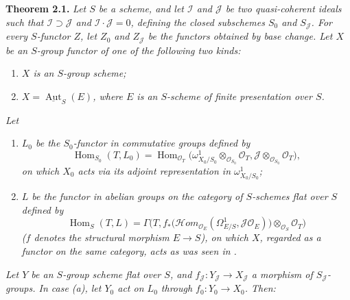 \medskip
\noindent{}\textbf{Theorem 2.1.}
\textit{Let \(S\) be a scheme, and let \(\mathscr I\) and \(\mathscr J\) be
two quasi-coherent ideals such that \(\mathscr I\supset\mathscr J\) and
\(\mathscr I\cdot\mathscr J=0\), defining the closed subschemes \(S_0\) and
\(S_{\mathscr J}\). For every \(S\)-functor \(Z\), let \(Z_0\) and
\(Z_{\mathscr J}\) be the functors obtained by base change. Let \(X\) be an
\(S\)-group functor of one of the following two kinds:}
\begin{enumerate}
\item[\(a\))] \textit{\(X\) is an \(S\)-group scheme;}
\item[\(b\))] \textit{\(X=\underline{\operatorname{Aut}}_S(E)\), where \(E\) is
  an \(S\)-scheme of finite presentation over \(S\).}
\end{enumerate}
\textit{Let}
\begin{enumerate}
\item[\(a\))] \textit{\(L_0\) be the \(S_0\)-functor in commutative groups
  defined by}
  \[
   \operatorname{Hom}_{S_0}(T,L_0)
   =\operatorname{Hom}_{\mathscr O_T}
   \bigl(\omega^1_{X_0/S_0}\otimes_{\mathscr O_{S_0}}\mathscr O_T,
   \mathscr J\otimes_{\mathscr O_{S_0}}\mathscr O_T\bigr),
  \]
  \textit{on which \(X_0\) acts via its adjoint representation in
  \(\omega^1_{X_0/S_0}\);}
\item[\(b\))] \textit{\(L\) be the functor in abelian groups on the category of
  \(S\)-schemes flat over \(S\) defined by}
  \[
   \operatorname{Hom}_S(T,L)
   =\Gamma\bigl(T,f_*\bigl(\mathscr{H}om_{\mathscr O_E}
   (\Omega^1_{E/S},\mathscr J\mathscr O_E)\bigr)
   \otimes_{\mathscr O_S}\mathscr O_T\bigr)
  \]
  \textit{(\(f\) denotes the structural morphism \(E\to S\)), on which \(X\),
  regarded as a functor on the same category, acts as was seen in .}
\end{enumerate}
\textit{Let \(Y\) be an \(S\)-group scheme flat over \(S\), and
\(f_{\mathscr J}:Y_{\mathscr J}\to X_{\mathscr J}\) a morphism of
\(S_{\mathscr J}\)-groups. In case (a), let \(Y_0\) act on \(L_0\) through
\(f_0:Y_0\to X_0\). Then:}

